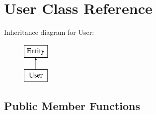 \hypertarget{classUser}{
\section{User Class Reference}
\label{classUser}
}
Inheritance diagram for User:\begin{figure}[H]
\begin{center}
\leavevmode
\includegraphics[height=2.000000cm]{classUser}
\end{center}
\end{figure}
\subsection*{Public Member Functions}

